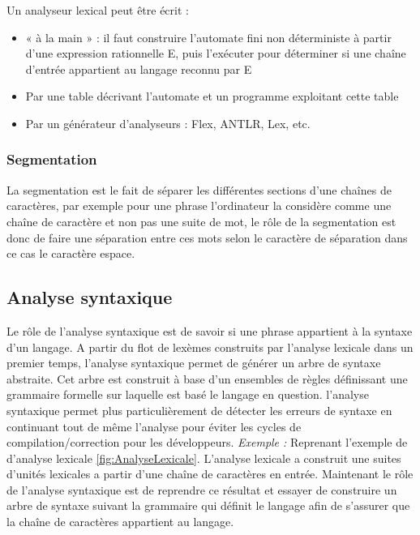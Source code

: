 \documentclass{article}
\begin{document}
Un analyseur lexical peut être écrit :
\begin{itemize}
			\item « à la main » : il faut construire l'automate fini non déterministe à partir d'une expression rationnelle E, puis l'exécuter pour déterminer si une chaîne d'entrée appartient au langage reconnu par E
			\item Par une table décrivant l'automate et un programme exploitant cette table
			\item Par un générateur d'analyseurs : Flex, ANTLR, Lex, etc.
\end{itemize}    

\subsubsection{Segmentation}
La segmentation est le fait de séparer les différentes sections d’une chaînes de caractères, par exemple pour une phrase l’ordinateur la considère comme une chaîne de caractère et non pas une suite de mot, le rôle de la segmentation est donc de faire une séparation entre ces mots selon le caractère de séparation dans ce cas le caractère espace.

\subsection{Analyse syntaxique}
Le rôle de l’analyse syntaxique \cite{refAnalyseSyntaxique} est de savoir si une phrase appartient à la syntaxe d’un langage.
A partir du flot de lexèmes construits par l’analyse lexicale dans un premier temps, l’analyse syntaxique permet de générer un arbre de syntaxe abstraite.
Cet arbre est construit à base d’un ensembles de règles définissant une grammaire formelle sur laquelle est basé le langage en question.
l’analyse syntaxique permet plus particulièrement de détecter les erreurs de syntaxe en continuant tout de même l’analyse pour éviter les cycles de compilation/correction pour les développeurs.\newline
\textit{Exemple :}\newline
Reprenant l'exemple de d'analyse lexicale \ref{fig:AnalyseLexicale}. L'analyse lexicale a construit une suites d'unités lexicales a partir d'une chaîne de caractères en entrée.\newline
Maintenant le rôle de l'analyse syntaxique est de reprendre ce résultat et essayer de construire un arbre de syntaxe suivant la grammaire qui définit le langage afin de s'assurer que la chaîne de caractères appartient au langage.
\end{document}
